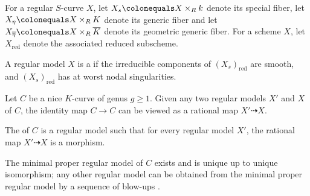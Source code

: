 For a regular $S$-curve $X$, let $X_s \colonequals X \times_R k$ denote its special fiber, let $X_\eta \colonequals X \times_R K$ denote its generic fiber and let $X_{\overline{\eta}} \colonequals X \times_R \overline{K}$ denote its geometric generic fiber. For a scheme $X$, let $X_{\mathrm{red}}$ denote the associated reduced subscheme. 

\begin{defin}
A regular model $X$ is a {} if the irreducible components of $(X_s)_{\mathrm{red}}$ are smooth, and $(X_s)_{\mathrm{red}}$ has at worst nodal singularities. 
\end{defin}

Let $C$ be a nice $K$-curve of genus $g \geq 1$. Given any two regular models $X'$ and $X$ of $C$, the identity map $C \rightarrow C$ can be viewed as a rational map $X' \dashrightarrow X$.
\begin{defin}
The {} of $C$ is a regular model such that for every regular model $X'$, the rational map $X' \dashrightarrow X$ is a morphism.
\end{defin}
The minimal proper regular model of $C$ exists and is unique up to unique isomorphism; any other regular model can be obtained from the minimal proper regular model by a sequence of blow-ups \cite[Theorem 4.4]{lich}.

